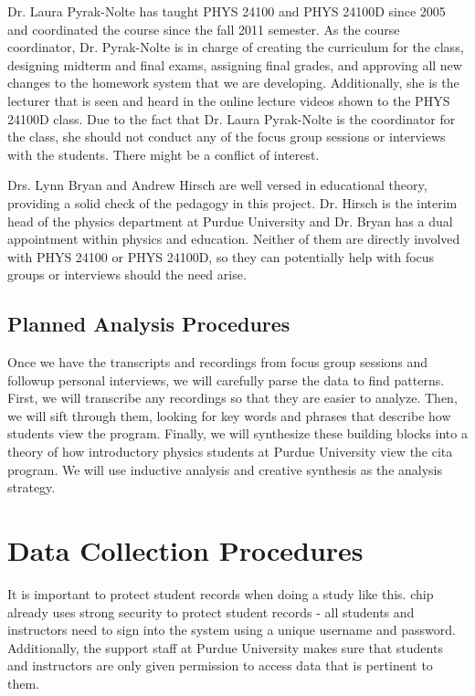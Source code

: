 Dr. Laura Pyrak-Nolte has taught PHYS 24100 and PHYS 24100D since 2005 and coordinated the course since the fall 2011 semester. As the course coordinator, Dr. Pyrak-Nolte is in charge of creating the curriculum for the class, designing midterm and final exams, assigning final grades, and approving all new changes to the homework system that we are developing. Additionally, she is the lecturer that is seen and heard in the online lecture videos shown to the PHYS 24100D class. Due to the fact that Dr. Laura Pyrak-Nolte is the coordinator for the class, she should not conduct any of the focus group sessions or interviews with the students. There might be a conflict of interest.

Drs. Lynn Bryan and Andrew Hirsch are well versed in educational theory, providing a solid check of the pedagogy in this project. Dr. Hirsch is the interim head of the physics department at Purdue University and Dr. Bryan has a dual appointment within physics and education. Neither of them are directly involved with PHYS 24100 or PHYS 24100D, so they can potentially help with focus groups or interviews should the need arise.

\subsection{Planned Analysis Procedures}

Once we have the transcripts and recordings from focus group sessions and followup personal interviews, we will carefully parse the data to find patterns. First, we will transcribe any recordings so that they are easier to analyze. Then, we will sift through them, looking for key words and phrases that describe how students view the program. Finally, we will synthesize these building blocks into a theory of how introductory physics students at Purdue University view the \gls{cita} program. We will use inductive analysis and creative synthesis as the analysis strategy.

\section{Data Collection Procedures}

It is important to protect student records when doing a study like this. \gls{chip} already uses strong security to protect student records - all students and instructors need to sign into the system using a unique username and password. Additionally, the support staff at Purdue University makes sure that students and instructors are only given permission to access data that is pertinent to them.

